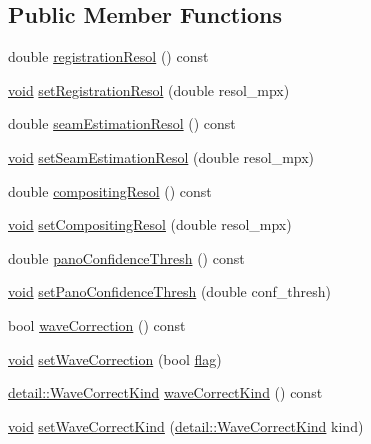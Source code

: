 \subsection*{Public Member Functions}
\begin{DoxyCompactItemize}
\item 
double \hyperlink{classcv_1_1Stitcher_a8aaec9b43e082f501a6792f7d398e79b}{registration\-Resol} () const 
\item 
\hyperlink{legacy_8hpp_a8bb47f092d473522721002c86c13b94e}{void} \hyperlink{classcv_1_1Stitcher_a9912fe8c095b8385267908e5ef707439}{set\-Registration\-Resol} (double resol\-\_\-mpx)
\item 
double \hyperlink{classcv_1_1Stitcher_a970adf4ead7a77584c01425b26361d80}{seam\-Estimation\-Resol} () const 
\item 
\hyperlink{legacy_8hpp_a8bb47f092d473522721002c86c13b94e}{void} \hyperlink{classcv_1_1Stitcher_ad0fcef52b2fedda1dbb90ea780cd7979}{set\-Seam\-Estimation\-Resol} (double resol\-\_\-mpx)
\item 
double \hyperlink{classcv_1_1Stitcher_a0fd87083a8a6f3774b745c64a8f2f23c}{compositing\-Resol} () const 
\item 
\hyperlink{legacy_8hpp_a8bb47f092d473522721002c86c13b94e}{void} \hyperlink{classcv_1_1Stitcher_afe927e80fcb2ca2061630ddd98eebba8}{set\-Compositing\-Resol} (double resol\-\_\-mpx)
\item 
double \hyperlink{classcv_1_1Stitcher_ab6ec8350126054a7538b262729abf53c}{pano\-Confidence\-Thresh} () const 
\item 
\hyperlink{legacy_8hpp_a8bb47f092d473522721002c86c13b94e}{void} \hyperlink{classcv_1_1Stitcher_a6f5e62bc1dd5d7bdb5f9313a2c21c558}{set\-Pano\-Confidence\-Thresh} (double conf\-\_\-thresh)
\item 
bool \hyperlink{classcv_1_1Stitcher_ae07a9623cbeb9910f7e02191c8d0142c}{wave\-Correction} () const 
\item 
\hyperlink{legacy_8hpp_a8bb47f092d473522721002c86c13b94e}{void} \hyperlink{classcv_1_1Stitcher_a968a2f4a1faddfdacbcfce54b44bab70}{set\-Wave\-Correction} (bool \hyperlink{legacy_8hpp_a0b4706eb64be40850fe9d384ecc82267}{flag})
\item 
\hyperlink{namespacecv_1_1detail_a83b24d4c3e93584986a56d9e43b9cf7f}{detail\-::\-Wave\-Correct\-Kind} \hyperlink{classcv_1_1Stitcher_acedf2cda0ea84ddca2342ad82129499c}{wave\-Correct\-Kind} () const 
\item 
\hyperlink{legacy_8hpp_a8bb47f092d473522721002c86c13b94e}{void} \hyperlink{classcv_1_1Stitcher_a17413f5c06e4e569bfd45e01d4e8ff4a}{set\-Wave\-Correct\-Kind} (\hyperlink{namespacecv_1_1detail_a83b24d4c3e93584986a56d9e43b9cf7f}{detail\-::\-Wave\-Correct\-Kind} kind)

\end{DoxyCompactItemize}

